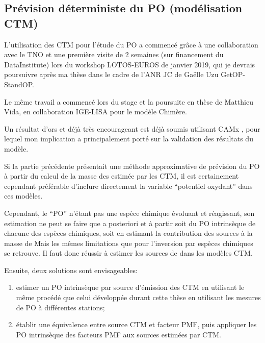 \subsection{Prévision déterministe du PO (modélisation CTM)}

\begin{tcolorbox}[colback=red!5!white,colframe=Melon,title=Note]
    L'utilisation des CTM pour l'étude du PO a commencé grâce à une collaboration avec le
    TNO et une première visite de 2 semaines (sur financement du DataInstitute) lors du
    workshop LOTOS-EUROS de janvier 2019, qui je devrais poursuivre après ma thèse dans le
    cadre de l'ANR JC de Gaëlle Uzu GetOP-StandOP.

    Le même travail a commencé lors du stage et la poursuite en thèse de Matthieu Vida, en
    collaboration IGE-LISA pour le modèle Chimère.

    Un résultat d'ors et déjà très encourageant est déjà soumis utilisant CAMx
    \parencite{daellenbachSourcessubmitted}, pour lequel mon implication a principalement
    porté sur la validation des résultats du modèle.
\end{tcolorbox}

Si la partie précédente présentait une méthode approximative de prévision du PO à partir
du calcul de la masse des \PMdix{} estimée par les CTM, il est certainement cependant
préférable d'inclure directement la variable ``potentiel oxydant'' dans ces modèles.

Cependant, le ``PO'' n'étant pas une espèce chimique évoluant et réagissant, son
estimation ne peut se faire que a posteriori et à partir soit du PO intrinsèque de chacune
des espèces chimiques, soit en estimant la contribution des sources à la masse de \PMdix
Mais les mêmes limitations que pour l'inversion par espèces chimiques se retrouve. Il faut donc
réussir à estimer les sources de \PMdix{} dans les modèles CTM.

Ensuite, deux solutions sont envisageables:
\begin{enumerate}
    \item estimer un PO intrinsèque par source d'émission des CTM en utilisant le même
        procédé que celui développée durant cette thèse en utilisant les mesures de PO à
        différentes stations;
    \item établir une équivalence entre source CTM et facteur PMF, puis appliquer les
        PO intrinsèque des facteurs PMF aux sources estimées par CTM.
\end{enumerate}

